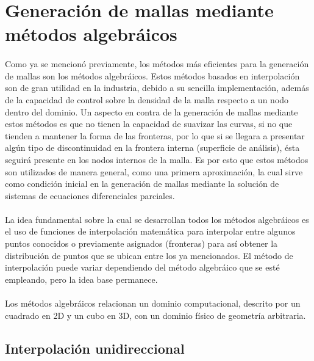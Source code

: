\documentclass[letterpaper, openright, 12pt]{book}
\begin{document}
\section{Generación de mallas mediante métodos algebráicos}
    \paragraph*{}
     Como ya se mencionó previamente, los métodos más eficientes para la
     generación de mallas son los métodos algebráicos. Estos métodos basados
     en interpolación son de gran utilidad en la industria, debido a su
     sencilla implementación, además de la capacidad de control sobre la
     densidad de la malla respecto a un nodo dentro del dominio. Un aspecto
     en contra de la generación de mallas mediante estos métodos es que no
     tienen la capacidad de suavizar las curvas, si no que tienden a mantener
     la forma de las fronteras, por lo que si se llegara a presentar algún
     tipo de discontinuidad en la frontera interna (superficie de análisis),
     ésta seguirá presente en los nodos internos de la malla. Es por esto que
     estos métodos son utilizados de manera general, como una primera
     aproximación, la cual sirve como condición inicial en la generación de
     mallas mediante la solución de sistemas de ecuaciones diferenciales
     parciales.\cite{farrashkhalvat}

    \paragraph*{}
    La idea fundamental sobre la cual se desarrollan todos los métodos
    algebráicos es el uso de funciones de interpolación matemática para
    interpolar entre algunos puntos conocidos o previamente asignados
    (fronteras) para así obtener la distribución de puntos que se ubican
    entre los ya mencionados. El método de interpolación puede variar
    dependiendo del método algebráico que se esté empleando, pero la idea
    base permanece.\cite{siladicParabolic}

    \paragraph*{}
    Los métodos algebráicos relacionan un dominio computacional, descrito
    por un cuadrado en 2D y un cubo en 3D, con un dominio físico de
    geometría arbitraria.

    \subsection{Interpolación unidireccional}
\end{document}
